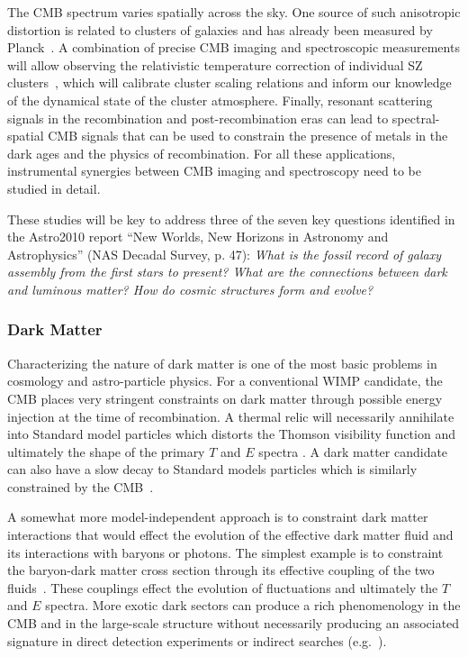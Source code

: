 The CMB spectrum varies spatially across the sky. One source of such anisotropic distortion is related to clusters of galaxies and has already been measured by Planck~\citep{Planck2013SZ}. A combination of precise CMB imaging and spectroscopic measurements will allow observing the relativistic temperature correction of individual SZ clusters~\citep{Sazonov1998, Itoh98, Challinor98}, which will calibrate cluster scaling relations and inform our knowledge of the dynamical state of the cluster atmosphere. Finally, resonant scattering signals in the recombination \citep{Jose2005, Carlos2007Pol, Lewis2013} and post-recombination eras \citep{Kaustuv2004, Schleicher2008} can lead to spectral-spatial CMB signals that can be used to constrain the presence of metals in the dark ages and the physics of recombination. For all these applications, instrumental synergies between CMB imaging and spectroscopy need to be studied in detail. 



These studies will be key to address three of the seven key questions identified in the Astro2010 report ``New Worlds, New Horizons in Astronomy and Astrophysics'' (NAS Decadal Survey, p. 47): {\it What is the fossil record of galaxy assembly                                                                               
from the first stars to present? What are the connections between dark and luminous matter? How do cosmic structures form and evolve?}


\vspace{-0.15in}
\subsubsection{Dark Matter}
\vspace{-0.05in}

Characterizing the nature of dark matter is one of the most basic problems in cosmology and astro-particle physics.  For a conventional WIMP candidate, the CMB places very stringent constraints on dark matter through possible energy injection at the time of recombination.  A thermal relic will necessarily annihilate into Standard model particles which distorts the Thomson visibility function and ultimately the shape of the primary $T$ and $E$ spectra \citep{Peebles2000, Chen2004, Padmanabhan2005}.  A dark matter candidate can also have a slow decay to Standard models particles which is similarly constrained by the CMB~\cite{Slatyer:2016qyl}.

A somewhat more model-independent approach is to constraint dark matter interactions that would effect the evolution of the effective dark matter fluid and its interactions with baryons or photons.  The simplest example is to constraint the baryon-dark matter cross section through its effective coupling of the two fluids~\cite{Dvorkin:2013cea}.  These couplings effect the evolution of fluctuations and ultimately the $T$ and $E$ spectra.  More exotic dark sectors can produce a rich phenomenology in the CMB and in the large-scale structure without necessarily producing an associated signature in direct detection experiments or indirect searches (e.g.~\cite{Cyr-Racine:2013fsa,Buen-Abad:2015ova,Lesgourgues:2015wza}). 

